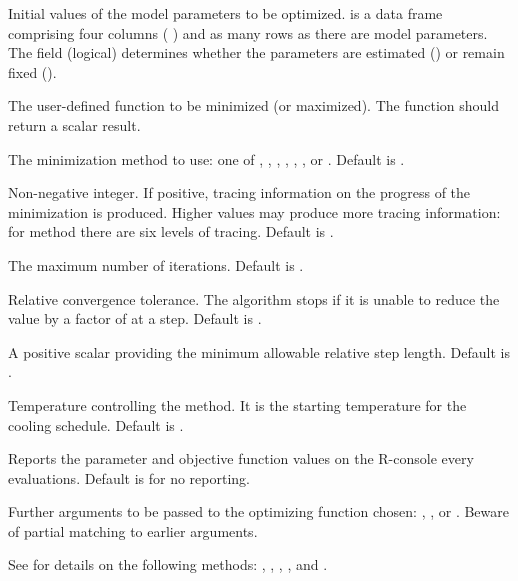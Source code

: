 \documentclass[letterpaper]{book}
\begin{document}
%
\begin{Arguments}
\begin{ldescription}
\item[\code{pvec}] Initial values of the model parameters to be optimized.
 is a data frame comprising four columns (
) and as many rows as there are model
parameters. The  field (logical) determines whether the 
parameters are estimated () or remain fixed ().
\item[\code{func}] The user-defined function to be minimized (or maximized).
The function should return a scalar result.
\item[\code{method}] The minimization method to use: one of , ,
, , , , or 
. Default is .
\item[\code{trace}] Non-negative integer. If positive, tracing information on the
progress of the minimization is produced. Higher values may produce more
tracing information: for method  there are six levels of
tracing. Default is .
\item[\code{maxit}] The maximum number of iterations. Default is .
\item[\code{reltol}] Relative convergence tolerance. The algorithm stops if it is
unable to reduce the value by a factor of 
at a step. Default is .
\item[\code{steptol}] A positive scalar providing the minimum allowable relative step length.
Default is .
\item[\code{temp}] Temperature controlling the  method. It is the
starting temperature for the cooling schedule. Default is .
\item[\code{repN}] Reports the parameter and objective function values on the R-console
every  evaluations. Default is  for no reporting.
\item[\code{...}] Further arguments to be passed to the optimizing function chosen:
, , or .
Beware of partial matching to earlier arguments.
\end{ldescription}
\end{Arguments}
%
\begin{Details}\relax
See  for details on the following methods: ,
, , , and .
\end{Details}
\end{document}
